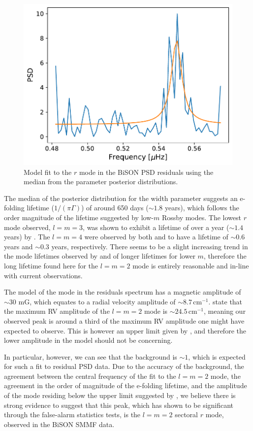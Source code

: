 \begin{figure}[!ht]
	\centering
	\includegraphics[width=0.65\columnwidth]{asymm_r-mode_model_fit.pdf}
	\caption{Model fit to the $r$ mode in the BiSON PSD residuals using the median from the parameter posterior distributions.}  \label{fig:rmode_asymm_fit}
\end{figure}

The median of the posterior distribution for the width parameter suggests an e-folding lifetime ($1/(\pi \Gamma)$) of around 650 days ($\sim 1.8$ years), which follows the order magnitude of the lifetime suggested by low-$m$ Rossby modes. The lowest $r$ mode observed, $l=m=3$, was shown to exhibit a lifetime of over a year ($\sim 1.4$ years) by \citet{liang_time-distance_2019}. The $l=m=4$ were observed by both \citet{loptien_global-scale_2018} and \citet{liang_time-distance_2019} to have a lifetime of $\sim 0.6$ years and $\sim 0.3$ years, respectively. There seems to be a slight increasing trend in the mode lifetimes observed by \citet{loptien_global-scale_2018} and \citet{liang_time-distance_2019} of longer lifetimes for lower $m$, therefore the long lifetime found here for the $l=m=2$ mode is entirely reasonable and in-line with current observations.

The model of the mode in the residuals spectrum has a magnetic amplitude of $\sim 30$ mG, which equates to a radial velocity amplitude of $\sim 8.7 \, \mathrm{cm}^{-1}$. \citet{lanza_sectoral_2019} state that the maximum RV amplitude of the $l=m=2$ mode is $\sim 24.5 \,\mathrm{cm}^{-1}$, meaning our observed peak is around a third of the maximum RV amplitude one might have expected to observe. This is however an upper limit given by \citet{lanza_sectoral_2019}, and therefore the lower amplitude in the model should not be concerning.

In particular, however, we can see that the background is $\sim 1$, which is expected for such a fit to residual PSD data. Due to the accuracy of the background, the agreement between the central frequency of the fit to the $l=m=2$ mode, the agreement in the order of magnitude of the e-folding lifetime, and the amplitude of the mode residing below the upper limit suggested by \citet{lanza_sectoral_2019}, we believe there is strong evidence to suggest that this peak, which has shown to be significant through the false-alarm statistics tests, is the $l=m=2$ sectoral $r$ mode, observed in the BiSON SMMF data.







